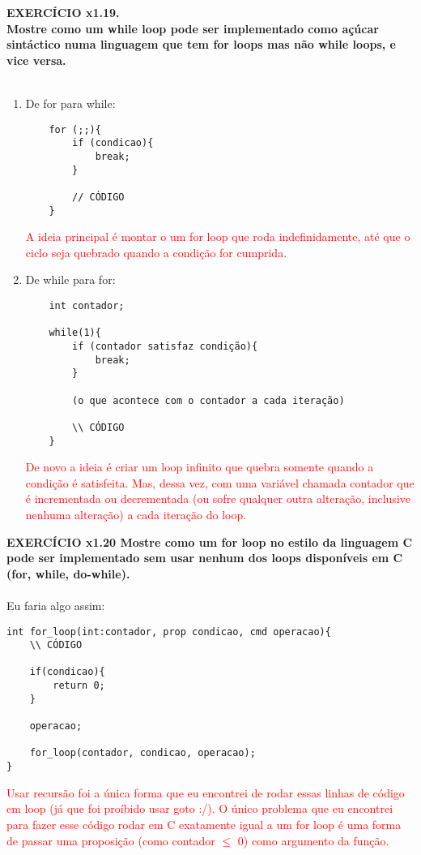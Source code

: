 \documentclass[a4paper, 12pt]{article}
\begin{document}
\noindent \textbf{EXERCÍCIO x1.19. \\
Mostre como um while loop pode ser implementado como açúcar sintáctico numa linguagem que tem for loops mas não while loops, e vice versa.} \\ \\
\begin{enumerate}
    \item De for para while:

    \begin{verbatim}
    for (;;){
        if (condicao){
            break;
        }

        // CÓDIGO
    }
    \end{verbatim}
    \textcolor{red}{A ideia principal é montar o um for loop que roda indefinidamente, até que o ciclo seja quebrado quando a condição for cumprida.}

    \item De while para for:
    
    \begin{verbatim}
    int contador;

    while(1){
        if (contador satisfaz condição){
            break;
        }

        (o que acontece com o contador a cada iteração)

        \\ CÓDIGO
    }
    \end{verbatim}

    \textcolor{red}{De novo a ideia é criar um loop infinito que quebra somente quando a condição é satisfeita. Mas, dessa vez, com uma variável chamada contador que é incrementada ou decrementada (ou sofre qualquer outra alteração, inclusive nenhuma alteração) a cada iteração do loop.}
        
\end{enumerate}
\vspace{1cm}
\noindent \textbf{EXERCÍCIO x1.20
Mostre como um for loop no estilo da linguagem C pode ser implementado sem usar
nenhum dos loops disponíveis em C (for, while, do-while).} \\ \\
Eu faria algo assim:
\begin{verbatim}
int for_loop(int:contador, prop condicao, cmd operacao){
    \\ CÓDIGO

    if(condicao){
        return 0;
    }

    operacao;

    for_loop(contador, condicao, operacao);
}
\end{verbatim}
\textcolor{red}{Usar recursão foi a única forma que eu encontrei de rodar essas linhas de código em loop (já que foi proíbido usar goto :/). O único problema que eu encontrei para fazer esse código rodar em C exatamente igual a um for loop é uma forma de passar uma proposição (como contador $\leq$ 0) como argumento da função.}
\end{document}
